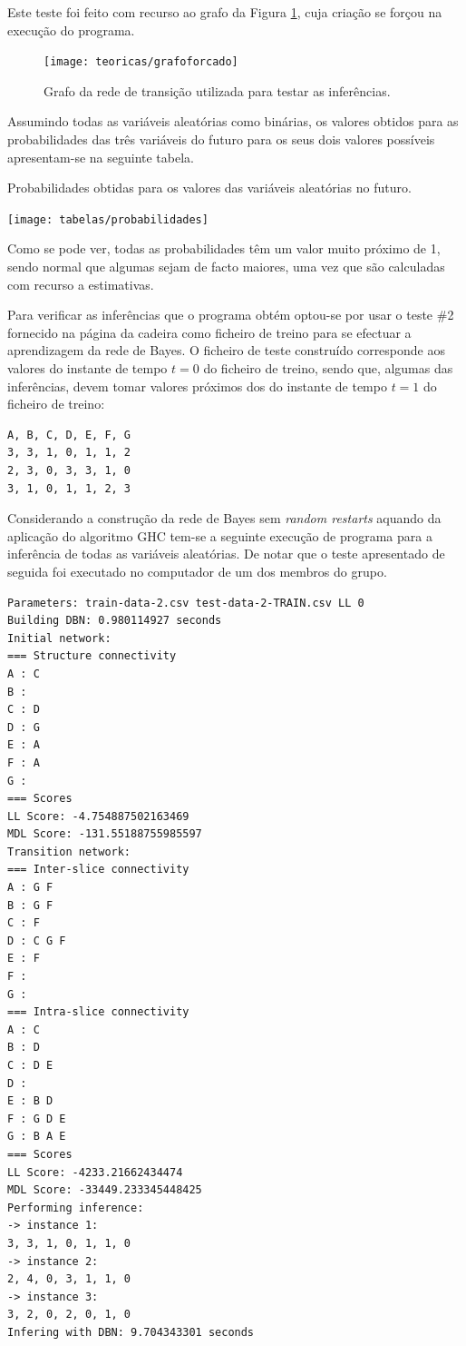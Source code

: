 \documentclass[10pt]{article}
\numberwithin{equation}{section}
\begin{document}
Este teste foi feito com recurso ao grafo da Figura \ref{fig:grafoforcado}, cuja criação se forçou na execução do programa.

\begin{figure}[H]
	\centering
	\texttt{[image: teoricas/grafoforcado]}
	\caption{Grafo da rede de transição utilizada para testar as inferências.}
	\vspace{-0.8em}
	\label{fig:grafoforcado}
\end{figure}

Assumindo todas as variáveis aleatórias como binárias, os valores obtidos para as probabilidades das três variáveis do futuro para os seus dois valores possíveis apresentam-se na seguinte tabela.

\begin{table}[H]
	\centering
	\caption{Probabilidades obtidas para os valores das variáveis aleatórias no futuro.}
	\vspace{-1.5mm}
	\texttt{[image: tabelas/probabilidades]}
\end{table}

\vspace{-1.5mm}
Como se pode ver, todas as probabilidades têm um valor muito próximo de 1, sendo normal que algumas sejam de facto maiores, uma vez que são calculadas com recurso a estimativas.

Para verificar as inferências que o programa obtém optou-se por usar o teste \#2 fornecido na página da cadeira como ficheiro de treino para se efectuar a aprendizagem da rede de Bayes. O ficheiro de teste construído corresponde aos valores do instante de tempo $t = 0$ do ficheiro de treino, sendo que, algumas das inferências, devem tomar valores próximos dos do instante de tempo $t = 1$ do ficheiro de treino:

\begin{lstlisting}
A, B, C, D, E, F, G
3, 3, 1, 0, 1, 1, 2
2, 3, 0, 3, 3, 1, 0
3, 1, 0, 1, 1, 2, 3
\end{lstlisting}

Considerando a construção da rede de Bayes sem \textit{random restarts} aquando da aplicação do algoritmo GHC tem-se a seguinte execução de programa para a inferência de todas as variáveis aleatórias. De notar que o teste apresentado de seguida foi executado no computador de um dos membros do grupo.

\begin{lstlisting}
Parameters: train-data-2.csv test-data-2-TRAIN.csv LL 0
Building DBN: 0.980114927 seconds
Initial network: 
=== Structure connectivity
A : C 
B : 
C : D 
D : G 
E : A 
F : A 
G : 
=== Scores
LL Score: -4.754887502163469
MDL Score: -131.55188755985597
Transition network: 
=== Inter-slice connectivity
A : G F 
B : G F 
C : F 
D : C G F 
E : F 
F : 
G : 
=== Intra-slice connectivity
A : C 
B : D 
C : D E 
D : 
E : B D 
F : G D E 
G : B A E 
=== Scores
LL Score: -4233.21662434474
MDL Score: -33449.233345448425
Performing inference:
-> instance 1: 
3, 3, 1, 0, 1, 1, 0
-> instance 2: 
2, 4, 0, 3, 1, 1, 0
-> instance 3: 
3, 2, 0, 2, 0, 1, 0
Infering with DBN: 9.704343301 seconds
\end{lstlisting}
\end{document}
